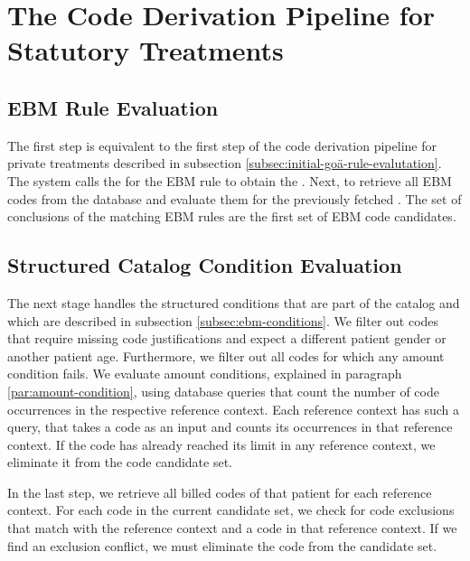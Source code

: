 \section{The Code Derivation Pipeline for Statutory Treatments}\label{sec:the-code-derivation-pipeline-for-statutory-treatments}

\subsection{EBM Rule Evaluation}\label{subsec:rule-evaluation}
The first step is equivalent to the first step of the code derivation pipeline for private treatments
described in subsection \ref{subsec:initial-goä-rule-evalutation}.
The system calls the \REIF for the EBM rule to obtain the \REI.
Next,  to retrieve all EBM codes from the database and evaluate them for the previously fetched \REI.
The set of conclusions of the matching EBM rules are the first set of EBM code candidates.

\subsection{Structured Catalog Condition Evaluation}\label{subsec:structured-catalog-condition-evaluation}
The next stage handles the structured conditions that are part of the catalog and which are described in subsection \ref{subsec:ebm-conditions}.
We filter out codes that require missing code justifications and expect a different patient gender or another patient age.
Furthermore, we filter out all codes for which any amount condition fails.
We evaluate amount conditions, explained in paragraph \ref{par:amount-condition},
using database queries that count the number of code occurrences in the respective reference context.
Each reference context has such a query, that takes a code as an input and counts its occurrences in that reference context.
If the code has already reached its limit in any reference context, we eliminate it from the code candidate set.

In the last step, we retrieve all billed codes of that patient for each reference context.
For each code in the current candidate set, we check for code exclusions that match with the reference context and a code in that reference context.
If we find an exclusion conflict, we must eliminate the code from the candidate set.

